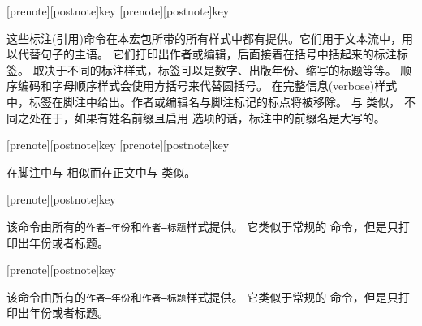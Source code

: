 \begin{ltxsyntax}

[prenote][postnote]{key}
[prenote][postnote]{key}

这些标注(引用)命令在本宏包所带的所有样式中都有提供。它们用于文本流中，用以代替句子的主语。
它们打印出作者或编辑，后面接着在括号中括起来的标注标签。
取决于不同的标注样式，标签可以是数字、出版年份、缩写的标题等等。
顺序编码和字母顺序样式会使用方括号来代替圆括号。
在完整信息(verbose)样式中，标签在脚注中给出。作者或编辑名与脚注标记的标点将被移除。
 与  类似，
不同之处在于，如果有姓名前缀且启用  选项的话，标注中的前缀名是大写的。

[prenote][postnote]{key}
[prenote][postnote]{key}

在脚注中与  相似而在正文中与  类似。

[prenote][postnote]{key}

该命令由所有的\texttt{作者--年份}和\texttt{作者--标题}样式提供。
它类似于常规的  命令，但是只打印出年份或者标题。

[prenote][postnote]{key}

该命令由所有的\texttt{作者--年份}和\texttt{作者--标题}样式提供。
它类似于常规的  命令，但是只打印出年份或者标题。


\end{ltxsyntax}
